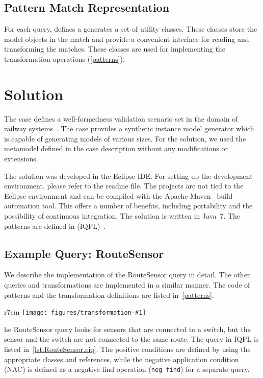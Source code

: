 \documentclass[submission,copyright,creativecommons]{eptcs}
\newcommand{\ttctransformation}[2]{
	\begin{wrapfigure}{r}{7cm}
		\centering
		\texttt{[image: figures/transformation-\#1]}
		\vspace{-3em}
	\end{wrapfigure}
}
\begin{document}
\subsection{Pattern Match Representation}

For each query, \eiq defines a generates a set of utility classes. These classes store the model objects in the match and provide a convenient interface for reading and transforming the matches. These classes are used for implementing the transformation operations (\autoref{patterns}).

\section{Solution}

The case defines a well-formedness validation scenario set in the domain of railway systems~\cite{ttc-trainbenchmark-case}. The case provides a synthetic instance model generator which is capable of generating models of various sizes. For the solution, we used the metamodel defined in the case description without any modifications or extensions.

The solution was developed in the Eclipse IDE. For setting up the development environment, please refer to the readme file. The projects are not tied to the Eclipse environment and can be compiled with the Apache Maven~\cite{Maven} build automation tool. This offers a number of benefits, including portability and the possibility of continuous integration. The solution is written in Java~7. The patterns are defined in \iqpl (IQPL)~\cite{iqpl}.

\subsection{Example Query: \textsf{RouteSensor}}

We describe the implementation of the \textsf{RouteSensor} query in detail. The other queries and transformations are implemented in a similar manner. The code of patterns and the transformation definitions are listed in~\autoref{patterns}.

\ttctransformation{routesensor}

The \textsf{RouteSensor} query looks for sensors that are connected to a switch, but the sensor and the switch are not connected to the same route. The query in IQPL is listed in~\autoref{lst:RouteSensor.eiq}. The positive conditions are defined by using the appropriate classes and references, while the negative application condition (NAC) is defined as a negative find operation (\texttt{neg find}) for a separate query.
\end{document}
